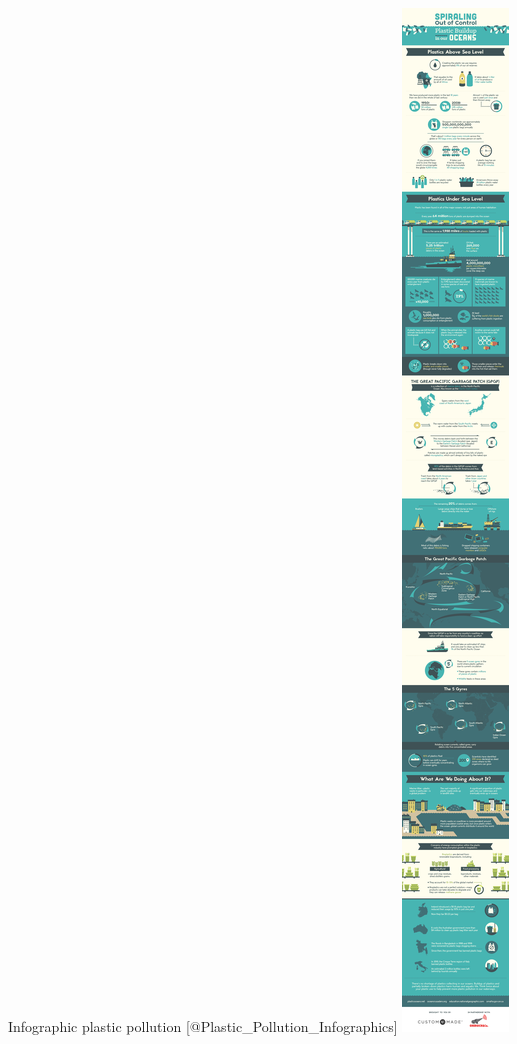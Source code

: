 \documentclass[]{book}
\theoremstyle{definition}
\theoremstyle{definition}
\theoremstyle{definition}
\theoremstyle{remark}
\begin{document}
Infographic plastic pollution {[}@Plastic\_Pollution\_Infographics{]}
\includegraphics{images/infographic-plastic-buildup.jpg}
\end{document}
